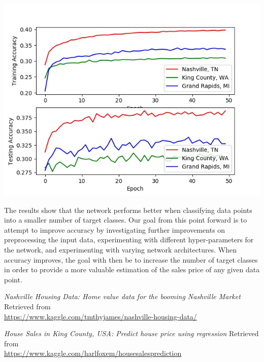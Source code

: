 \documentclass[10pt]{article}
\begin{document}
\begin{multicols}{2}
\begin{center}
			\label{fig:fig_nn_results_5}
		\end{center}
		\begin{center}
            \captionsetup{type=figure}
			\includegraphics[scale=0.38]{NeuralNet/nn_10_class_results} \\
			\label{fig:fig_nn_results_10}
		\end{center}
		The results show that the network performs better when classifying data points into a smaller number of target classes. Our goal from this point forward is to attempt to improve accuracy by investigating further improvements on preprocessing the input data, experimenting with different hyper-parameters for the network, and experimenting with varying network architectures. When accuracy improves, the goal with then be to increase the number of target classes in order to provide a more valuable estimation of the sales price of any given data point.
		\begin{thebibliography}{13}
			\textit{Nashville Housing Data: Home value data for the booming Nashville Market}
			Retrieved from \\ \small{\url{https://www.kaggle.com/tmthyjames/nashville-housing-data/}}
			
			\textit{House Sales in King County, USA: Predict house price using regression}
			Retrieved from \\ \small{\url{https://www.kaggle.com/harlfoxem/housesalesprediction}}	
			

\end{thebibliography}
\end{multicols}
\end{document}
